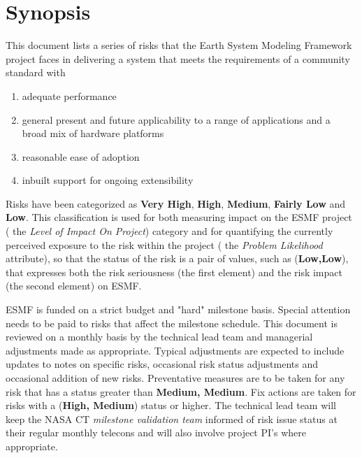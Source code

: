 \documentclass[english]{article}
\begin{document}




\newpage
\tableofcontents

\newpage
\section{Synopsis}

This document lists a series of risks that the Earth System Modeling Framework project faces
in delivering a system that meets the requirements of a community standard with

\begin{enumerate}
\item adequate performance
\item general present and future applicability to a range of applications and a broad mix of hardware platforms
\item reasonable ease of adoption
\item inbuilt support for ongoing extensibility
\end{enumerate}

Risks have been categorized as {\bf Very High}, {\bf High}, {\bf Medium}, {\bf Fairly Low} and {\bf Low}.
This classification is used for both measuring impact on the ESMF project ( the {\it Level of Impact On Project})
category and for quantifying the currently perceived exposure to the risk within
the project ( the {\it Problem Likelihood} attribute), so that the
status of the risk is a pair of values, such as ({\bf Low,Low}), that expresses
both the risk seriousness (the first element) and the risk impact (the second element) on
ESMF.  

ESMF is funded on a strict budget and "hard" milestone basis. Special attention needs to be
paid to risks that affect the milestone schedule.
This document is reviewed on a monthly basis by the technical lead team and managerial adjustments
made as appropriate. Typical adjustments are expected to include updates to notes on specific risks,
occasional risk status adjustments and occasional addition of new risks.
Preventative measures are to be taken for any risk that has a status greater than {\bf Medium, Medium}.
Fix actions are taken for risks with a ({\bf High, Medium}) status or higher.
The technical lead team will keep the NASA CT {\it milestone validation team} informed of 
risk issue status at their regular monthly telecons and will also involve project PI's where 
appropriate.
\end{document}
